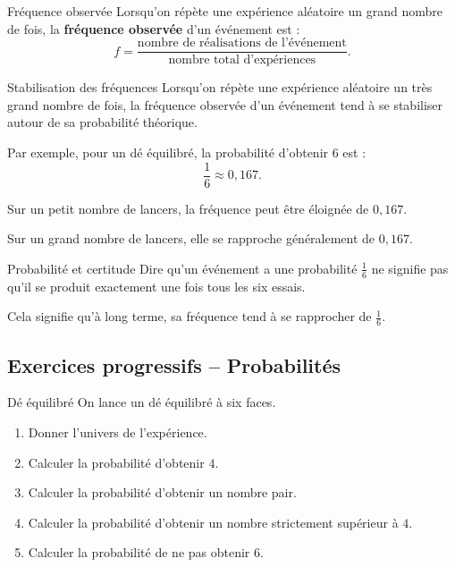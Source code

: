 \documentclass[11pt,a4paper]{article}
\begin{document}
\begin{definitionbox}{Fréquence observée}
Lorsqu'on répète une expérience aléatoire un grand nombre de fois, la \textbf{fréquence observée} d'un événement est :
\[
f=\frac{\text{nombre de réalisations de l'événement}}{\text{nombre total d'expériences}}.
\]
\end{definitionbox}

\begin{retenirbox}{Stabilisation des fréquences}
Lorsqu'on répète une expérience aléatoire un très grand nombre de fois, la fréquence observée d'un événement tend à se stabiliser autour de sa probabilité théorique.

Par exemple, pour un dé équilibré, la probabilité d'obtenir $6$ est :
\[
\frac{1}{6}\approx 0{,}167.
\]

Sur un petit nombre de lancers, la fréquence peut être éloignée de $0{,}167$.

Sur un grand nombre de lancers, elle se rapproche généralement de $0{,}167$.
\end{retenirbox}

\begin{warningbox}{Probabilité et certitude}
Dire qu'un événement a une probabilité $\frac{1}{6}$ ne signifie pas qu'il se produit exactement une fois tous les six essais.

Cela signifie qu'à long terme, sa fréquence tend à se rapprocher de $\frac{1}{6}$.
\end{warningbox}

\subsection{Exercices progressifs -- Probabilités}

\begin{exercisebox}{Dé équilibré}
On lance un dé équilibré à six faces.

\begin{enumerate}
    \item Donner l'univers de l'expérience.
    \item Calculer la probabilité d'obtenir $4$.
    \item Calculer la probabilité d'obtenir un nombre pair.
    \item Calculer la probabilité d'obtenir un nombre strictement supérieur à $4$.
    \item Calculer la probabilité de ne pas obtenir $6$.
\end{enumerate}
\end{exercisebox}
\end{document}
